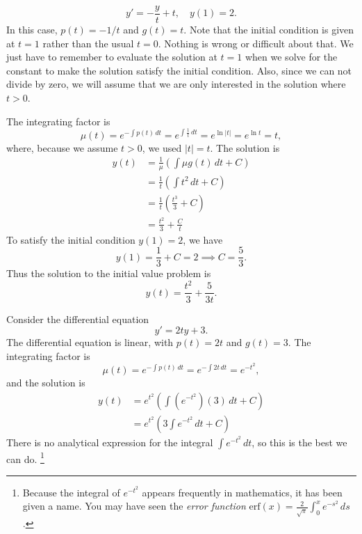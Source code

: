 \begin{xexample}
\begin{equation}
   y' = -\frac{y}{t} + t, \quad y(1) = 2.
\end{equation}
In this case, $p(t) = -1/t$ and $g(t) = t$.
Note that the initial condition is given at
$t=1$ rather than the usual $t=0$.  Nothing
is wrong or difficult about that. We just have
to remember to evaluate the solution at $t=1$
when we solve for the constant to make
the solution satisfy the initial condition.
Also, since we can not divide by zero, we will
assume that we are only interested in the solution
where $t > 0$.

The integrating factor is
\begin{equation}
   \mu(t) = e^{-\int p(t)\,dt} = e^{\int \frac{1}{t}\, dt}
      = e^{\ln |t|} = e^{\ln t} = t,
\end{equation}
where, because we assume $t>0$,  we used $|t|=t$.
The solution is
\begin{equation}
\begin{split}
   y(t) & = \frac{1}{\mu} \left( \int \mu g(t)\,dt + C\right) \\
        & = \frac{1}{t} \left( \int t^2 \,dt+C\right) \\
	& = \frac{1}{t} \left( \frac{t^3}{3} + C \right)\\
	& = \frac{t^2}{3} + \frac{C}{t}
\end{split}
\end{equation}
To satisfy the initial condition $y(1)=2$, we have
\begin{equation}
   y(1) = \frac{1}{3} + C = 2 \implies C = \frac{5}{3}.
\end{equation}
Thus the solution to the initial value problem is
\begin{equation}
   y(t) = \frac{t^2}{3} + \frac{5}{3t}.
\end{equation}
\end{xexample}

\begin{xexample}
Consider the differential equation
\begin{equation}
    y' = 2ty + 3.
\end{equation}
The differential equation is linear, with $p(t) = 2t$ and $g(t)=3$.
The integrating factor is
\begin{equation}
   \mu(t) = e^{-\int p(t)\,dt} = e^{-\int 2t\, dt}
      = e^{-t^2},
\end{equation}
and the solution is
\begin{equation}
\begin{split}
   y(t) & = e^{t^2} \left( \int \left(e^{-t^2}\right)\left(3\right)\,dt + C\right) \\
        & = e^{t^2} \left( 3\int e^{-t^2}\,dt+C\right)
\end{split}
\end{equation}
There is no analytical expression for the integral $\int e^{-t^2}\, dt$,
so this is the best we can do.%
\footnote{%
Because the integral of $e^{-t^2}$ appears frequently in mathematics,
it has been given a name.
You may have seen the \emph{error function}
$\textrm{erf}(x) = \frac{2}{\sqrt{\pi}}\int_0^x e^{-s^2}\,ds$.}
\end{xexample}

